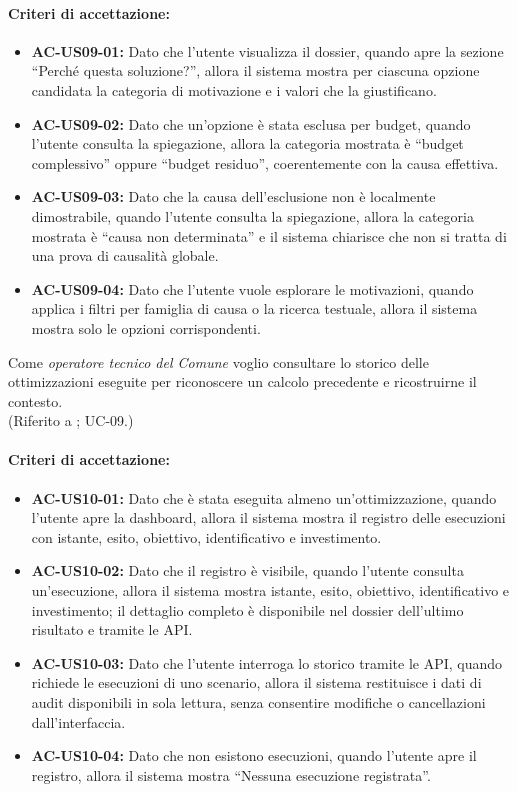 \paragraph{Criteri di accettazione:}
\begin{itemize}[leftmargin=1.4em]
    \item \textbf{AC-US09-01:} Dato che l'utente visualizza il dossier, quando apre la sezione ``Perché questa soluzione?'', allora il sistema mostra per ciascuna opzione candidata la categoria di motivazione e i valori che la giustificano.
    \item \textbf{AC-US09-02:} Dato che un'opzione è stata esclusa per budget, quando l'utente consulta la spiegazione, allora la categoria mostrata è ``budget complessivo'' oppure ``budget residuo'', coerentemente con la causa effettiva.
    \item \textbf{AC-US09-03:} Dato che la causa dell'esclusione non è localmente dimostrabile, quando l'utente consulta la spiegazione, allora la categoria mostrata è ``causa non determinata'' e il sistema chiarisce che non si tratta di una prova di causalità globale.
    \item \textbf{AC-US09-04:} Dato che l'utente vuole esplorare le motivazioni, quando applica i filtri per famiglia di causa o la ricerca testuale, allora il sistema mostra solo le opzioni corrispondenti.
\end{itemize}

 \label{us:storico}
Come \textit{operatore tecnico del Comune} voglio consultare lo storico delle ottimizzazioni eseguite per riconoscere un calcolo precedente e ricostruirne il contesto. \\ (Riferito a ; UC-09.)

\paragraph{Criteri di accettazione:}
\begin{itemize}[leftmargin=1.4em]
    \item \textbf{AC-US10-01:} Dato che è stata eseguita almeno un'ottimizzazione, quando l'utente apre la dashboard, allora il sistema mostra il registro delle esecuzioni con istante, esito, obiettivo, identificativo e investimento.
    \item \textbf{AC-US10-02:} Dato che il registro è visibile, quando l'utente consulta un'esecuzione, allora il sistema mostra istante, esito, obiettivo, identificativo e investimento; il dettaglio completo è disponibile nel dossier dell'ultimo risultato e tramite le API.
    \item \textbf{AC-US10-03:} Dato che l'utente interroga lo storico tramite le API, quando richiede le esecuzioni di uno scenario, allora il sistema restituisce i dati di audit disponibili in sola lettura, senza consentire modifiche o cancellazioni dall'interfaccia.
    \item \textbf{AC-US10-04:} Dato che non esistono esecuzioni, quando l'utente apre il registro, allora il sistema mostra ``Nessuna esecuzione registrata''.
\end{itemize}

